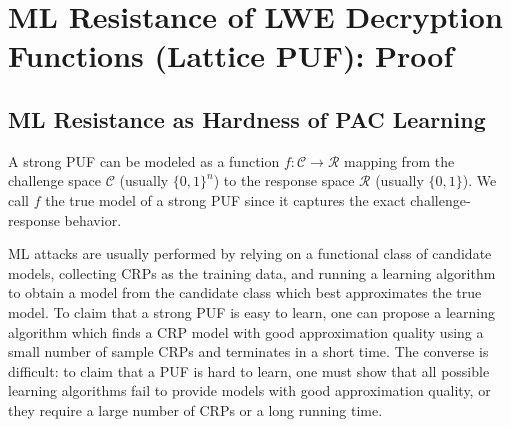 \section{ML Resistance of LWE Decryption Functions  (Lattice PUF): Proof}
\label{sec:lwe}

\subsection{ML Resistance as Hardness of PAC Learning}
A strong PUF can be modeled as a function $f:\mathcal{C}\rightarrow \mathcal{R}$ mapping from the challenge space $\mathcal{C}$ (usually $\{0,1\}^n$) to the response space $\mathcal{R}$ (usually $\{0,1\}$).
We call $f$ the true model of a strong PUF since it captures the exact challenge-response behavior. 

ML attacks are usually performed by relying on a functional class of candidate models, collecting CRPs as the training data, and running a learning algorithm to obtain a model from the candidate class which best approximates the true model. %
To claim that a strong PUF is easy to learn, one can propose a learning algorithm which finds a CRP model with good approximation quality using a small number of sample CRPs and terminates in a short time.
The converse is difficult: 
to claim that a PUF is hard to learn, one must show that all possible learning algorithms fail to provide models with good approximation quality, or they require a large number of CRPs or a long running time.

